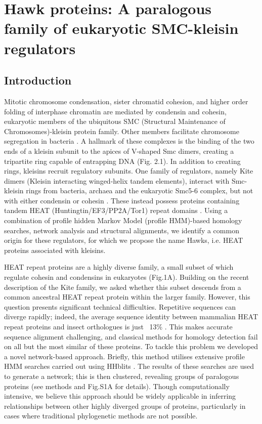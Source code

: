\documentclass[a4paper,11pt,twoside,openright]{scrbook}
\let\cite\supercite
\begin{document}
\chapter{Hawk proteins: A paralogous family of eukaryotic SMC-kleisin regulators}

\section{Introduction}
Mitotic chromosome condensation, sister chromatid cohesion, and higher order folding of interphase chromatin are mediated by condensin and cohesin, eukaryotic members of the ubiquitous SMC (Structural Maintenance of Chromosomes)-kleisin protein family. Other members facilitate chromosome segregation in bacteria \cite{Nasmyth2009, Hirano2016}. A hallmark of these complexes is the binding of the two ends of a kleisin subunit to the apices of V-shaped Smc dimers, creating a tripartite ring capable of entrapping DNA (Fig. 2.1). In addition to creating rings, kleisins recruit regulatory subunits. One family of regulators, namely Kite dimers (Kleisin interacting winged-helix tandem elements), interact with Smc-kleisin rings from bacteria, archaea and the eukaryotic Smc5-6 complex, but not with either condensin or cohesin \cite{Palecek2015}. These instead possess proteins containing tandem HEAT (Huntingtin/EF3/PP2A/Tor1) repeat domains \cite{Andrade1995}. Using a combination of profile hidden Markov Model (profile HMM)-based homology searches, network analysis and structural alignments, we identify a common origin for these regulators, for which we propose the name Hawks, i.e. HEAT proteins associated with kleisins.

HEAT repeat proteins are a highly diverse family, a small subset of which regulate cohesin and condensins in eukaryotes \cite{Hirano2016} (Fig.1A). Building on the recent description of the Kite family, we asked whether this subset descends from a common ancestral HEAT repeat protein within the larger family. However, this question presents significant technical difficulties. Repetitive sequences can diverge rapidly; indeed, the average sequence identity between mammalian HEAT repeat proteins and insect orthologues is just ~13\% \cite{Andrade2001c}. This makes accurate sequence alignment challenging, and classical methods for homology detection fail on all but the most similar of these proteins. To tackle this problem we developed a novel network-based approach. Briefly, this method utilises extensive profile HMM searches carried out using HHblits \cite{Remmert2011}. The results of these searches are used to generate a network; this is then clustered, revealing groups of paralogous proteins (see methods and Fig.S1A for details). Though computationally intensive, we believe this approach should be widely applicable in inferring relationships between other highly diverged groups of proteins, particularly in cases where traditional phylogenetic methods are not possible.
\end{document}

